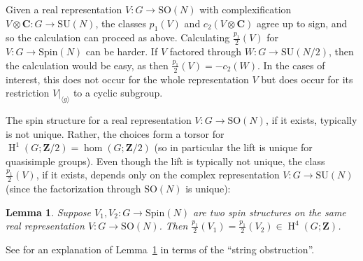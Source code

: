 \documentclass[pdftex]{sigma}
\numberwithin{equation}{section}
\newtheorem{Lemma}[Theorem]{Lemma}
\newcommand\bC{\mathbf C}
\newcommand\bZ{\mathbf Z}
\DeclareMathOperator\homology{H}
\renewcommand\H{\homology}
\newcommand\<\langle
\renewcommand\>\rangle
\newcommand\Spin{\mathrm{Spin}}
\newcommand\SU{\mathrm{SU}}
\newcommand\SO{\mathrm{SO}}
\begin{document}
Given a real representation $V\colon G \to \SO(N)$ with complexification $V \otimes \bC\colon G \to \SU(N)$, the classes $p_1(V)$ and $c_2(V\otimes \bC)$ agree up to sign, and so the calculation can proceed as above. Calculating $\frac{p_1}2(V)$ for $V\colon G \to \Spin(N)$ can be harder. If $V$ factored through $W\colon G \to \SU(N/2)$, then the calculation would be easy, as then $\frac{p_1}2(V) = -c_2(W)$. In the cases of interest, this does not occur for the whole representation $V$ but does occur for its restriction $V|_{\langle g\rangle}$ to a cyclic subgroup.

The spin structure for a real representation $V\colon G \to \SO(N)$, if it exists, typically is not unique.
 Rather, the choices form a torsor for $\H^1(G;\bZ/2) = \hom(G;\bZ/2)$ (so in particular the lift is unique for quasisimple groups). Even though the lift is typically not unique, the class~$\frac{p_1}2(V)$, if it exists, depends only on the complex representation $V\colon G \to \mathrm{SU}(N)$ (since the factorization through $\SO(N)$ is unique):

\begin{Lemma}\label{lem:p12} Suppose $V_1,V_2\colon G \to \Spin(N)$ are two spin structures on the same real representation $V\colon G \to \SO(N)$. Then $\frac{p_1}2(V_1) = \frac{p_1}2(V_2) \in \H^4(G;\bZ)$.
\end{Lemma}

See \cite[Section~1.4]{jft} for an explanation of Lemma~\ref{lem:p12} in terms of the ``string obstruction''.
\end{document}
